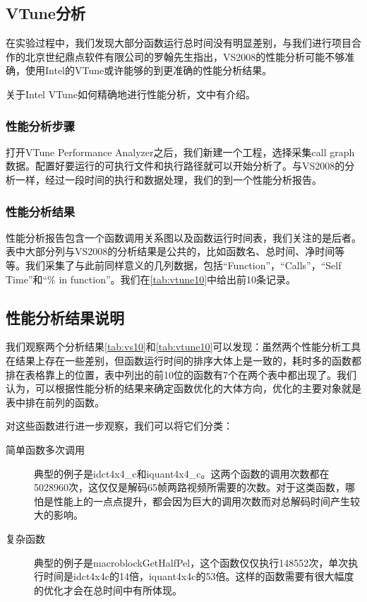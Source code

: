 \subsection{VTune分析}
\label{subsec:vtuneprofiling}

在实验过程中，我们发现大部分函数运行总时间没有明显差别，与我们进行项目合作的北京世纪鼎点软件有限公司的罗翰先生指出，VS2008的性能分析可能不够准确，使用Intel的VTune或许能够的到更准确的性能分析结果。

关于Intel VTune如何精确地进行性能分析，文中有介绍。

\subsubsection{性能分析步骤}
\label{subsubsec:profilingprocess}

打开VTune Performance Analyzer之后，我们新建一个工程，选择采集call graph数据。配置好要运行的可执行文件和执行路径就可以开始分析了。与VS2008的分析一样，经过一段时间的执行和数据处理，我们的到一个性能分析报告。

\subsubsection{性能分析结果}
\label{subsubsec:reportexerpt}



性能分析报告包含一个函数调用关系图以及函数运行时间表，我们关注的是后者。表中大部分列与VS2008的分析结果是公共的，比如函数名、总时间、净时间等等。我们采集了与此前同样意义的几列数据，包括“Function”，“Calls”，“Self Time”和“\% in function”。我们在\autoref{tab:vtune10}中给出前10条记录。

\subsection{性能分析结果说明}
\label{subsec:commentonreport}

我们观察两个分析结果\autoref{tab:vs10}和\autoref{tab:vtune10}可以发现：虽然两个性能分析工具在结果上存在一些差别，但函数运行时间的排序大体上是一致的，耗时多的函数都排在表格靠上的位置，表中列出的前10位的函数有7个在两个表中都出现了。我们认为，可以根据性能分析的结果来确定函数优化的大体方向，优化的主要对象就是表中排在前列的函数。

对这些函数进行进一步观察，我们可以将它们分类：
\begin{description}
\item[简单函数多次调用] 典型的例子是idct4x4\_c和iquant4x4\_c。这两个函数的调用次数都在5028960次，这仅仅是解码65帧两路视频所需要的次数。对于这类函数，哪怕是性能上的一点点提升，都会因为巨大的调用次数而对总解码时间产生较大的影响。
\item[复杂函数] 典型的例子是macroblockGetHalfPel，这个函数仅仅执行148552次，单次执行时间是idct4x4c的14倍，iquant4x4c的53倍。这样的函数需要有很大幅度的优化才会在总时间中有所体现。
\end{description}

